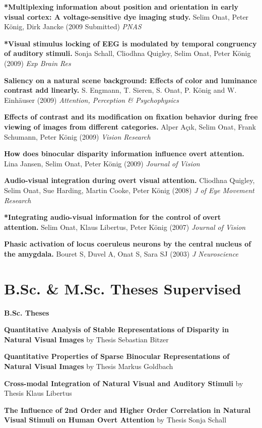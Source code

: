 \textbf{*Multiplexing information about position and orientation in early
visual cortex: A voltage-sensitive dye imaging study.} Selim Onat, Peter
K\"onig, Dirk Jancke (2009 Submitted) \textit{PNAS}


\textbf{*Visual stimulus locking of EEG is modulated by temporal congruency of
auditory stimuli.} Sonja Schall, Cliodhna Quigley, Selim Onat, Peter
K\"onig (2009) \textit{Exp Brain Res}

\textbf{Saliency on a natural scene background: Effects of color and luminance
contrast add linearly.} S. Engmann, T. Sieren, S. Onat, P. K\"onig and W.
Einh\"auser (2009) \textit{Attention, Perception \& Psychophysics} 


\textbf{Effects of contrast and its modification on fixation behavior
during free viewing of images from different categories.} Alper A\c{c}{\i}k, Selim
Onat, Frank Schumann, Peter K\"onig (2009) \textit{Vision Research}

\textbf{How does binocular disparity information influence overt attention.}
Lina Jansen, Selim Onat, Peter K\"onig (2009) \textit{Journal of Vision}

\textbf{Audio-visual integration during overt visual attention.} Cliodhna
Quigley, Selim Onat, Sue Harding, Martin Cooke, Peter K\"onig (2008)
\textit{J of Eye Movement Research}


\textbf{*Integrating audio-visual information for the control of overt
attention.} Selim Onat, Klaus Libertus, Peter K\"onig (2007) \textit{Journal
of Vision}

\textbf{Phasic activation of locus coeruleus neurons by the central nucleus
of the amygdala.} Bouret S, Duvel A, Onat S, Sara SJ (2003) \textit{J
Neuroscience}

\section*{B.Sc. \& M.Sc. Theses Supervised }

\textbf{B.Sc. Theses}

\textbf{Quantitative Analysis of Stable Representations of 
Disparity in Natural Visual Images} by Thesis Sebastian Bitzer

\textbf{Quantitative Properties of Sparse Binocular Representations of
Natural Visual Images} by Thesis Markus Goldbach 

\textbf{Cross-modal Integration of Natural Visual and Auditory Stimuli}
by Thesis Klaus Libertus

\textbf{The Influence of 2nd Order and Higher Order Correlation in Natural
Visual Stimuli on Human Overt Attention} by Thesis Sonja Schall

